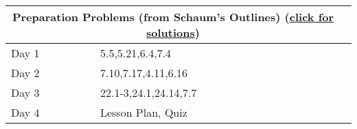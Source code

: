 \begin{center}
\begin{tabular}{ll|l}
\multicolumn{2}{c}{Preparation Problems (from Schaum's Outlines)
(\href{http://ilearn.byui.edu/bbcswebdav/institution/Physical\_Sci\_Eng/Mathematics/Personal\%20Folders/WoodruffB/316/04-First-Order-ODEs-Preparation-Solutions.pdf}{click for solutions})
}
&
\\
\hline\hline
Day 1&
5.5,5.21,6.4,7.4
&
\\ \hline
Day 2&
7.10,7.17,4.11,6.16
&
\\ \hline
Day 3&
22.1-3,24.1,24.14,7.7 
&
\\ \hline
Day 4&
Lesson Plan,
Quiz&
\\ \hline
\end{tabular}
\end{center}






